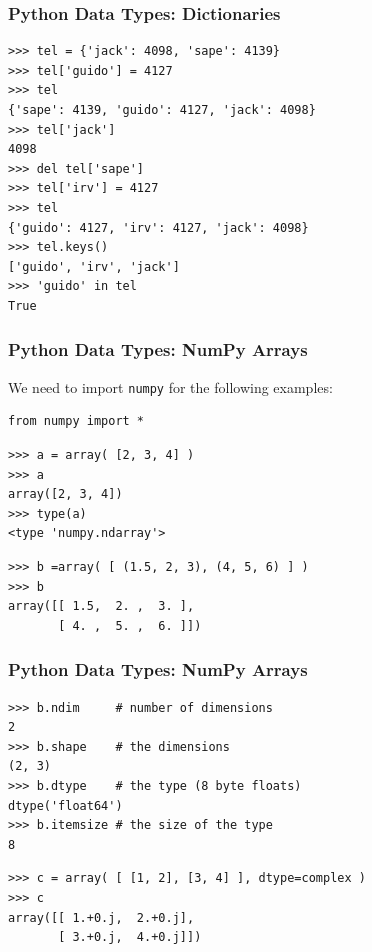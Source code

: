 \documentclass[t,10pt,compress=false,usepdftitle=false]{beamer}
\begin{document}
\begin{frame}[fragile]
    \frametitle{Python Data Types: Dictionaries}
    \begin{myColorBox}{0.9}{}
\begin{verbatim}
>>> tel = {'jack': 4098, 'sape': 4139}
>>> tel['guido'] = 4127
>>> tel
{'sape': 4139, 'guido': 4127, 'jack': 4098}
>>> tel['jack']
4098
>>> del tel['sape']
>>> tel['irv'] = 4127
>>> tel
{'guido': 4127, 'irv': 4127, 'jack': 4098}
>>> tel.keys()
['guido', 'irv', 'jack']
>>> 'guido' in tel
True
\end{verbatim}
    \end{myColorBox}
\end{frame}


\begin{frame}[fragile]
    \frametitle{Python Data Types: NumPy Arrays}
We need to import \verb#numpy# for the following examples:
    \begin{myColorBox}{0.9}{}
\begin{verbatim}
from numpy import *
\end{verbatim}
    \end{myColorBox}
    \begin{myColorBox}{0.9}{}
\begin{verbatim}
>>> a = array( [2, 3, 4] )
>>> a
array([2, 3, 4])
>>> type(a) 
<type 'numpy.ndarray'>
\end{verbatim}
    \end{myColorBox}
    \pause
    \begin{myColorBox}{0.9}{}
\begin{verbatim}
>>> b =array( [ (1.5, 2, 3), (4, 5, 6) ] )
>>> b
array([[ 1.5,  2. ,  3. ],
       [ 4. ,  5. ,  6. ]])
\end{verbatim}
    \end{myColorBox}
\end{frame}

\begin{frame}[fragile]
    \frametitle{Python Data Types: NumPy Arrays}
    \begin{myColorBox}{0.9}{}
\begin{verbatim}
>>> b.ndim     # number of dimensions
2
>>> b.shape    # the dimensions
(2, 3)
>>> b.dtype    # the type (8 byte floats)
dtype('float64')
>>> b.itemsize # the size of the type
8
\end{verbatim}
    \end{myColorBox}
    \pause    
    \begin{myColorBox}{0.9}{}
\begin{verbatim}
>>> c = array( [ [1, 2], [3, 4] ], dtype=complex )
>>> c
array([[ 1.+0.j,  2.+0.j],
       [ 3.+0.j,  4.+0.j]])
\end{verbatim}
    \end{myColorBox}
\end{frame}
\end{document}
